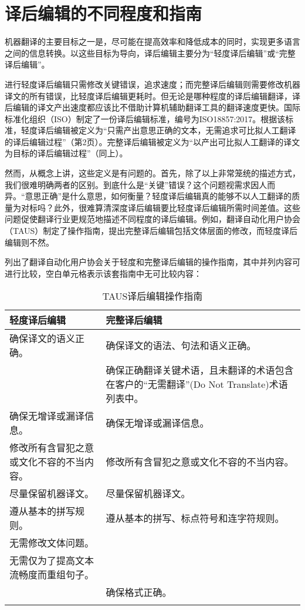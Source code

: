 \documentclass[output=paper,colorlinks,citecolor=brown]{langscibook}
\begin{document}
\section{译后编辑的不同程度和指南}\label{sec:obrien:2}

机器翻译的主要目标之一是，尽可能在提高效率和降低成本的同时，实现更多语言之间的信息转换。以这些目标为导向，译后编辑主要分为“轻度译后编辑”或“完整译后编辑”。

进行轻度译后编辑只需修改关键错误，追求速度；而完整译后编辑则需要修改机器译文的所有错误，比轻度译后编辑更耗时。但无论是哪种程度的译后编辑翻译，译后编辑的译文产出速度都应该比不借助计算机辅助翻译工具的翻译速度更快。国际标准化组织（ISO）制定了一份译后编辑标准\citep{ISO2017}，编号为ISO18857:2017。根据该标准，轻度译后编辑被定义为“只需产出意思正确的文本，无需追求可比拟人工翻译的译后编辑过程”（第2页）。完整译后编辑被定义为“以产出可比拟人工翻译的译文为目标的译后编辑过程”（同上）。

\begin{sloppypar}
然而，从概念上讲，这些定义是有问题的。首先，除了以上非常笼统的描述方式，我们很难明确两者的区别。到底什么是“关键”错误？这个问题视需求因人而异。“意思正确”是什么意思，如何衡量？轻度译后编辑真的能够不以人工翻译的质量为对标吗？此外，很难算清深度译后编辑要比轻度译后编辑所需时间差值。这些问题促使翻译行业更规范地描述不同程度的译后编辑。例如，翻译自动化用户协会（TAUS）制定了操作指南，提出完整译后编辑包括文体层面的修改，而轻度译后编辑则不然。
\end{sloppypar}

列出了翻译自动化用户协会关于轻度和完整译后编辑的操作指南\citep{TAUS2010}，其中并列内容可进行比较，空白单元格表示该套指南中无可比较内容：


\begin{table}[t]
\begin{tabularx}{\textwidth}{QQ}
\lsptoprule
轻度译后编辑 & 完整译后编辑\\
\midrule
确保译文的语义正确。& 确保译文的语法、句法和语义正确。\\
\tablevspace
& 确保正确翻译关键术语，且未翻译的术语包含在客户的“无需翻译”(Do Not Translate)术语列表中。\\
\tablevspace
确保无增译或漏译信息。& 确保无增译或漏译信息。
 \\
\tablevspace
修改所有含冒犯之意或文化不容的不当内容。& 修改所有含冒犯之意或文化不容的不当内容。
\\
\tablevspace
尽量保留机器译文。 & 尽量保留机器译文。\\
\tablevspace
遵从基本的拼写规则。& 遵从基本的拼写、标点符号和连字符规则。
\\
\tablevspace
无需修改文体问题。& \\
\tablevspace
无需仅为了提高文本流畅度而重组句子。& \\
\tablevspace
& 确保格式正确。\\
\lspbottomrule
\end{tabularx}
\caption{TAUS译后编辑操作指南\label{tab:obrien:1}}
\end{table}
\end{document}
